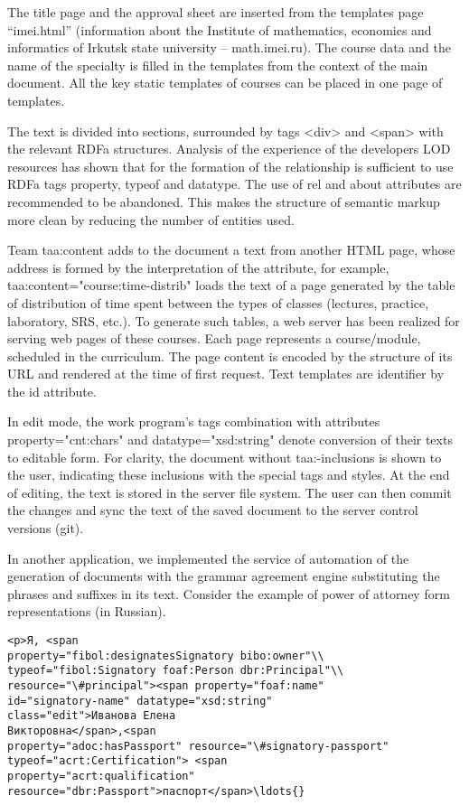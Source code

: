 \documentclass[12pt]{llncs}
\begin{document}
The title page and the approval sheet are inserted from the templates
page ``imei.html'' (information about the Institute of mathematics,
economics and informatics of Irkutsk state university -- math.imei.ru).
The course data and the name of the specialty is filled in the templates
from the context of the main document. All the key static templates of
courses can be placed in one page of templates.

The text is divided into sections, surrounded by tags
<div> and <span> with the
relevant RDFa structures. Analysis of the experience of the developers
LOD resources has shown that for the formation of the relationship is
sufficient to use RDFa tags property, typeof and datatype. The use of
rel and about attributes are recommended to be abandoned. This makes the
structure of semantic markup more clean by reducing the number of
entities used.

Team taa:content adds to the document a text from another HTML page,
whose address is formed by the interpretation of the attribute, for
example, taa:content="course:time-distrib" loads the text of a page
generated by the table of distribution of time spent between the types
of classes (lectures, practice, laboratory, SRS, etc.). To generate such
tables, a web server has been realized for serving web pages of these
courses. Each page represents a course/module, scheduled in the
curriculum. The page content is encoded by the structure of its URL and
rendered at the time of first request. Text templates are identifier by
the id attribute.

In edit mode, the work program's tags combination with attributes
property="cnt:chars" and datatype="xsd:string" denote conversion of
their texts to editable form. For clarity, the document without
taa:-inclusions is shown to the user, indicating these inclusions with
the special tags and styles. At the end of editing, the text is stored
in the server file system. The user can then commit the changes and sync
the text of the saved document to the server control versions (git).

In another application, we implemented the service of automation of the
generation of documents with the grammar agreement engine substituting
the phrases and suffixes in its text. Consider the example of power of
attorney form representations (in Russian).

\begin{russian}\footnotesize
\begin{verbatim}
<p>Я, <span
property="fibol:designatesSignatory bibo:owner"\\
typeof="fibol:Signatory foaf:Person dbr:Principal"\\
resource="\#principal"><span property="foaf:name"
id="signatory-name" datatype="xsd:string"
class="edit">Иванова Елена
Викторовна</span>,<span
property="adoc:hasPassport" resource="\#signatory-passport"
typeof="acrt:Certification"> <span
property="acrt:qualification"
resource="dbr:Passport">паспорт</span>\ldots{}
\end{verbatim}
\end{russian}
\end{document}
